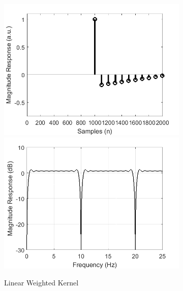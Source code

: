 \documentclass[a4paper]{article}
\begin{document}
\begin{figure}[hbtp]
    \begin{subfigure}{.33\textwidth}
        \includegraphics[width=\textwidth]{img/kernel_linear.png}\\
        \includegraphics[width=\textwidth]{img/mag_linear.png}
        \caption{Linear Weighted Kernel}\label{fig:LinearKernel}
    \end{subfigure}
    \begin{subfigure}{.33\textwidth}

\end{subfigure}
\end{figure}
\end{document}
